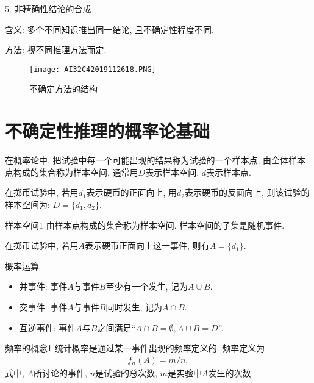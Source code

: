 5. 非精确性结论的合成

    含义: 多个不同知识推出同一结论, 且不确定性程度不同.

    方法: 视不同推理方法而定.
\begin{figure}[H]
    \centering
    \texttt{[image: AI32C42019112618.PNG]}
    \caption{不确定方法的结构}
    \label{AI32fig2618}
\end{figure}
\section{不确定性推理的概率论基础}\label{AI32C6Sec6.3}
在概率论中, 把试验中每一个可能出现的结果称为试验的一个样本点, 由全体样本点构成的集合称为样本空间.
通常用$D$表示样本空间, $d$表示样本点.

\begin{example}
  在掷币试验中, 若用$d_1$表示硬币的正面向上, 用$d_2$表示硬币的反面向上, 则该试验的样本空间为: $D=\{d_1, d_2\}$.
\end{example}

\begin{mydef}{样本空间}{1}
    由样本点构成的集合称为样本空间. 样本空间的子集是随机事件.
\end{mydef}

\begin{example}
  在掷币试验中, 若用$A$表示硬币正面向上这一事件, 则有$A=\{d_1\}$.
\end{example}

概率运算
\begin{itemize}
\item 并事件: 事件$A$与事件$B$至少有一个发生, 记为$A\cup B$.

\item 交事件: 事件$A$与事件$B$同时发生, 记为$A\cap B$.

\item 互逆事件: 事件$A$与$B$之间满足“$A\cap B=\emptyset,  A\cup B=D$”.
\end{itemize}

\begin{mydef}{频率的概念}{1}
统计概率是通过某一事件出现的频率定义的. 频率定义为
\begin{align}
    f_n(A)=m/n,
\end{align}
式中, $A$所讨论的事件, $n$是试验的总次数, $m$是实验中$A$发生的次数.
\end{mydef}

